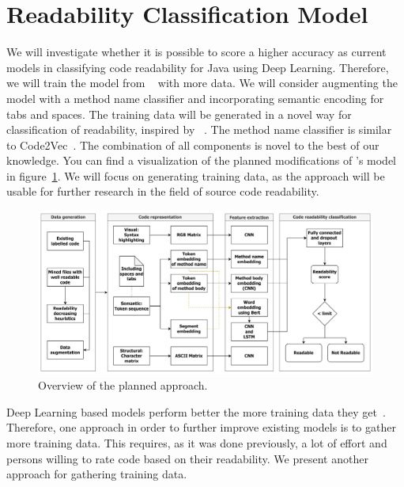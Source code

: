\documentclass[%
class=scrreprt,
chapterprefix=false,%
open=right,%
twoside=false,%
paper=a4,%
logofile={Logo\_zentral\_farbig\_EN.png},%
thesistype=master,%
UKenglish,%
]{se2thesis}
\begin{document}
	
	
	\section{Readability Classification Model} \label{Readability Classification Model}

	
	We will investigate whether it is possible to score a higher accuracy as current models in classifying code readability for Java using Deep Learning. Therefore, we will train the model from \citeauthor{mi2022towards}~\cite{mi2022towards} with more data. We will consider augmenting the model with a method name classifier and incorporating semantic encoding for tabs and spaces. The training data will be generated in a novel way for classification of readability, inspired by \citeauthor{loriot2022styler}~\cite{loriot2022styler}. The method name classifier is similar to Code2Vec~\cite{alon2019code2vec}. The combination of all components is novel to the best of our knowledge. You can find a visualization of the planned modifications of \citeauthor{mi2022towards}'s model in figure~\ref{fig:model_pipeline}. We will focus on generating training data, as the approach will be usable for further research in the field of source code readability.
	
	\begin{figure}[t]
		\centering
		\includegraphics[width=\textwidth]{img/model_pipeline_old.png}
		\caption{Overview of the planned approach.}
		\label{fig:model_pipeline}
	\end{figure}
	
	Deep Learning based models perform better the more training data they get~\cite{hestness2017deep}. Therefore, one approach in order to further improve existing models is to gather more training data.
	This requires, as it was done previously, a lot of effort and persons willing to rate code based on their readability. We present another approach for gathering training data.
	
\end{document}
